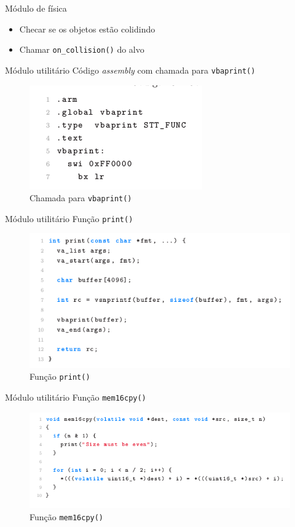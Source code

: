 \documentclass[notes, mathserif]{beamer}
\begin{document}
\begin{frame}{M\'odulo de f\'isica}
	\begin{itemize}
		\item Checar se os objetos est\~ao colidindo
		\item Chamar \texttt{on\_collision()} do alvo
	\end{itemize}
\end{frame}

\begin{frame}{M\'odulo utilit\'ario}
	C\'odigo \textit{assembly} com chamada para \texttt{vbaprint()}
	\begin{figure}[H]
		\includegraphics[width=.4\linewidth]{figuras/print_asm.png}
		\centering
		\caption{Chamada para \texttt{vbaprint()}}
		\label{fig:vbaprint}
	\end{figure}
\end{frame}


\begin{frame}{M\'odulo utilit\'ario}
	Fun\c c\~ao \texttt{print()}
	\begin{figure}[H]
		\includegraphics[width=.7\linewidth]{figuras/print.png}
		\centering
		\caption{Fun\c c\~ao \texttt{print()}}
		\label{fig:print}
	\end{figure}
\end{frame}

\begin{frame}{M\'odulo utilit\'ario}
	Fun\c c\~ao \texttt{mem16cpy()}
	\begin{figure}[H]
		\includegraphics[width=.7\linewidth]{figuras/mem16cpy.png}
		\centering
		\caption{Fun\c c\~ao \texttt{mem16cpy()}}
		\label{fig:mem16cpy}
	\end{figure}
\end{frame}
\end{document}
